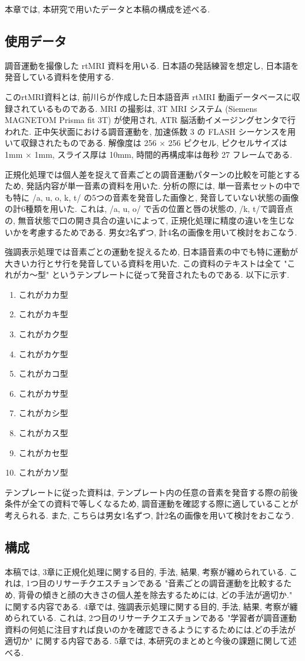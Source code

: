 本章では, 本研究で用いたデータと本稿の構成を述べる.

\subsection{使用データ}\label{data}
調音運動を撮像した rtMRI 資料を用いる. 日本語の発話練習を想定し, 日本語を発音している資料を使用する.

このrtMRI資料とは, 前川らが作成した日本語音声 rtMRI 動画データベース\cite{rtMRI}に収録されているものである. MRI の撮影は, 3T MRI システム (Siemens MAGNETOM Prisma fit 3T) が使用され, ATR 脳活動イメージングセンタで行われた. 正中矢状面における調音運動を, 加速係数 3 の FLASH シーケンスを用いて収録されたものである. 解像度は 256 × 256 ピクセル, ピクセルサイズは 1mm × 1mm, スライス厚は 10mm, 時間的再構成率は毎秒 27 フレームである.

正規化処理では個人差を捉えて音素ごとの調音運動パターンの比較を可能とするため, 発話内容が単一音素の資料を用いた. 分析の際には, 単一音素セットの中でも特に /a, u, o, k, t/ の5つの音素を発音した画像と, 発音していない状態の画像の計6種類を用いた. これは, /a, u, o/ で舌の位置と唇の状態の, /k, t/で調音点の, 無音状態で口の開き具合の違いによって, 正規化処理に精度の違いを生じないかを考慮するためである. 男女2名ずつ, 計4名の画像を用いて検討をおこなう.

強調表示処理では音素ごとの運動を捉えるため, 日本語音素の中でも特に運動が大きいカ行とサ行を発音している資料を用いた. この資料のテキストは全て "これがカ〜型" というテンプレートに従って発音されたものである. 以下に示す.
\begin{enumerate}
   \item これがカカ型
   \item これがカキ型
   \item これがカク型
   \item これがカケ型
   \item これがカコ型
   \item これがカサ型
   \item これがカシ型
   \item これがカス型
   \item これがカセ型
   \item これがカソ型
\end{enumerate}
テンプレートに従った資料は, テンプレート内の任意の音素を発音する際の前後条件が全ての資料で等しくなるため, 調音運動を確認する際に適していることが考えられる. また, こちらは男女1名ずつ, 計2名の画像を用いて検討をおこなう.

\subsection{構成}
本稿では,  3章に正規化処理に関する目的, 手法, 結果, 考察が纏められている. これは, 1つ目のリサーチクエスチョンである "音素ごとの調音運動を比較するため, 背骨の傾きと顔の大きさの個人差を除去するためには, どの手法が適切か." に関する内容である.
4章では, 強調表示処理に関する目的, 手法, 結果, 考察が纏められている. これは, 2つ目のリサーチクエスチョンである "学習者が調音運動資料の何処に注目すれば良いのかを確認できるようにするためには,どの手法が適切か" に関する内容である.
5章では, 本研究のまとめと今後の課題に関して述べる.